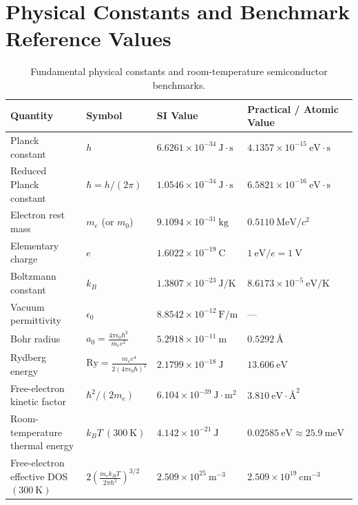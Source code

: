 \documentclass[11pt,a4paper]{article}
\newcommand{\hb}{\hbar}
\begin{document}
\begin{abstract}
\begin{enumerate}[leftmargin=1.5cm, noitemsep]
\end{enumerate}
\end{abstract}

\tableofcontents
\clearpage

\section*{Physical Constants and Benchmark Reference Values}
\begin{table}[htbp]
\centering
\small
\renewcommand{\arraystretch}{1.22}
\begin{tabular}{llll}
\toprule
\textbf{Quantity} & \textbf{Symbol} & \textbf{SI Value} & \textbf{Practical / Atomic Value} \\
\midrule
Planck constant & $h$ & $6.6261 \times 10^{-34}\ \mathrm{J\cdot s}$ & $4.1357 \times 10^{-15}\ \mathrm{eV\cdot s}$ \\
Reduced Planck constant & $\hb = h/(2\pi)$ & $1.0546 \times 10^{-34}\ \mathrm{J\cdot s}$ & $6.5821 \times 10^{-16}\ \mathrm{eV\cdot s}$ \\
Electron rest mass & $m_e$ (or $m_0$) & $9.1094 \times 10^{-31}\ \mathrm{kg}$ & $0.5110\ \mathrm{MeV}/c^2$ \\
Elementary charge & $e$ & $1.6022 \times 10^{-19}\ \mathrm{C}$ & $1\ \mathrm{eV}/e = 1\ \mathrm{V}$ \\
Boltzmann constant & $k_B$ & $1.3807 \times 10^{-23}\ \mathrm{J/K}$ & $8.6173 \times 10^{-5}\ \mathrm{eV/K}$ \\
Vacuum permittivity & $\epsilon_0$ & $8.8542 \times 10^{-12}\ \mathrm{F/m}$ & --- \\
Bohr radius & $a_0 = \frac{4\pi\epsilon_0\hb^2}{m_e e^2}$ & $5.2918 \times 10^{-11}\ \mathrm{m}$ & $0.5292\ \text{\AA}$ \\
Rydberg energy & $\mathrm{Ry} = \frac{m_e e^4}{2(4\pi\epsilon_0\hb)^2}$ & $2.1799 \times 10^{-18}\ \mathrm{J}$ & $13.606\ \mathrm{eV}$ \\
Free-electron kinetic factor & $\hb^2/(2m_e)$ & $6.104 \times 10^{-39}\ \mathrm{J\cdot m^2}$ & $3.810\ \mathrm{eV\cdot\text{\AA}^2}$ \\
Room-temperature thermal energy & $k_B T\ (300\ \mathrm{K})$ & $4.142 \times 10^{-21}\ \mathrm{J}$ & $0.02585\ \mathrm{eV} \approx 25.9\ \mathrm{meV}$ \\
Free-electron effective DOS $(300\ \mathrm{K})$ & $2\left(\frac{m_e k_B T}{2\pi\hb^2}\right)^{3/2}$ & $2.509 \times 10^{25}\ \mathrm{m^{-3}}$ & $2.509 \times 10^{19}\ \mathrm{cm^{-3}}$ \\
\bottomrule
\end{tabular}
\caption{Fundamental physical constants and room-temperature semiconductor benchmarks.}
\label{tab:constants_master}
\end{table}
\end{document}
